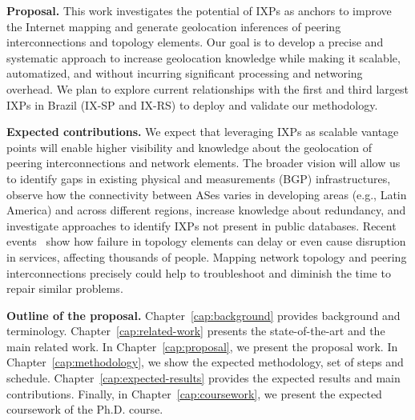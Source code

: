 	\textbf{Proposal.} This work investigates the potential of IXPs as anchors to improve the Internet mapping and generate geolocation inferences of peering interconnections and topology elements. Our goal is to develop a precise and systematic approach to increase geolocation knowledge while making it scalable, automatized, and without incurring significant processing and networing overhead. We plan to explore current relationships with the first and third largest IXPs in Brazil (IX-SP and IX-RS) to deploy and validate our methodology.



	\textbf{Expected contributions.} We expect that leveraging IXPs as scalable vantage points will enable higher visibility and knowledge about the geolocation of peering interconnections and network elements. The broader vision will allow us to identify gaps in existing physical and measurements (BGP) infrastructures, observe how the connectivity between ASes varies in developing areas (e.g., Latin America) and across different regions, increase knowledge about redundancy, and investigate approaches to identify IXPs not present in public databases. 
	Recent events~\cite{routerDMV, routerUnited} show how failure in topology elements can delay or even cause disruption in services, affecting thousands of people. Mapping network topology and peering interconnections precisely could help to troubleshoot and diminish the time to repair similar problems.

	\textbf{Outline of the proposal.} Chapter~\ref{cap:background} provides background and terminology. Chapter~\ref{cap:related-work} presents the state-of-the-art and the main related work. In Chapter~\ref{cap:proposal}, we present the proposal work. In Chapter~\ref{cap:methodology}, we show the expected methodology, set of steps and schedule. Chapter~\ref{cap:expected-results} provides the expected results and main contributions. Finally, in Chapter~\ref{cap:coursework}, we present the expected coursework of the Ph.D. course.


